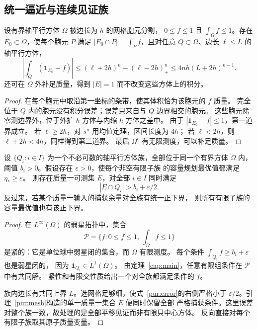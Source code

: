 \subsection{统一逼近与连续见证族}\label{pur:section}

\begin{lemma}[保留胞元质量的示性函数逼近]\label{pur:mesh}
设有界轴平行方体 $\Omega$ 被边长为 $h$ 的网格胞元分割，
$0\le f\le1$ 且 $\int_\Omega f\le1$。存在 $E_0\subset\Omega$，使每个胞元 $P$ 满足
$|E_0\cap P|=\int_Pf$，且对任意 $Q\subset\Omega$、边长 $\ell\le L$ 的轴平行方体，
\begin{equation}\label{pur:error}
 \left|\int_Q(\mathbf1_{E_0}-f)\right|
 \le(\ell+2h)^n-(\ell-2h)_+^n
 \le4nh(L+2h)^{n-1}.
\end{equation}
还可在 $\Omega$ 外补足质量，得到 $|E|=1$ 而不改变这些方体上的积分。
\end{lemma}
\begin{proof}
在每个胞元中取沿第一坐标的条带，使其体积恰为该胞元的 $f$ 质量。
完全位于 $Q$ 内的胞元没有积分误差；误差只来自与 $Q$ 边界相交的胞元。
这些胞元除零测边界外，位于外扩 $h$ 方体与内缩 $h$ 方体之差中。
由于 $|\mathbf1_{E_0}-f|\le1$，第一道界成立。
若 $\ell\ge2h$，对 $s^n$ 用均值定理，区间长度为 $4h$；
若 $\ell<2h$，则 $\ell+2h<4h$，同样得到第二道界。
最后 $\Omega^c$ 有无限测度，可以补足质量。
\end{proof}

\begin{theorem}[统一有限余量到任意见证族]\label{pur:continuum}
设 $\{Q_i:i\in I\}$ 为一个不必可数的轴平行方体族，全部位于同一个有界方体
$\Omega$ 内，阈值 $b_i>0$。假设存在 $\varepsilon>0$，使每个非空有限子族
的容量规划最优值都满足 $\eta_*\ge\varepsilon$。
则存在质量一可测集 $E$，对全部 $i\in I$ 同时满足
\[
 |E\cap Q_i|>b_i+\varepsilon/2.
\]
反过来，若某个质量一输入的捕获余量对全族有统一正下界，
则所有有限子族的容量最优值也有该正下界。
\end{theorem}
\begin{proof}
在 $L^\infty(\Omega)$ 的弱星拓扑中，集合
\[
 \mathcal P=\{f:0\le f\le1,\ \int_\Omega f\le1\}
\]
是紧的：它是单位球中弱星闭的集合，而 $\Omega$ 有限测度。
每个条件 $\int_{Q_i}f\ge b_i+\varepsilon$ 也是弱星闭的，
因为 $\mathbf1_{Q_i}\in L^1(\Omega)$。
由定理~\ref{cap:main}，任意有限组条件在 $\mathcal P$ 中有共同解。
紧性和有限交性质给出一个对全族都满足条件的 $f$。

族内边长有共同上界 $L$。选网格足够细，使式~\eqref{pur:error}的右侧严格小于
$\varepsilon/2$。引理~\ref{pur:mesh}构造的单一质量一集合 $E$ 便同时保留全部
严格捕获条件。这里误差对整个族一致，故处理的是全部平移见证而非有限只中心方体。
反向直接对每个有限子族取其原子质量变量。
\end{proof}

